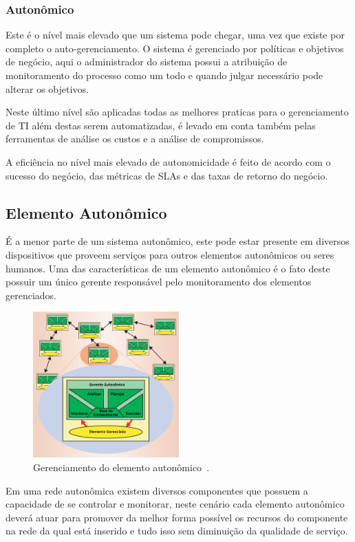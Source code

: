 \documentclass[11pt,twoside]{article}
\begin{document}
\subsubsection{Autonômico}
Este é o nível mais elevado que um sistema pode chegar, uma vez que existe por completo o auto-gerenciamento. O sistema é gerenciado por políticas e objetivos de negócio, aqui o administrador do sistema possui a atribuição de monitoramento do processo como um todo e quando julgar necessário pode alterar os objetivos. 

Neste último nível são aplicadas todas as melhores praticas para o gerenciamento de TI além destas serem automatizadas, é levado em conta também pelas ferramentas de análise os custos e a análise de compromissos.

A eficiência no nível mais elevado de autonomicidade é feito de acordo com o sucesso do negócio, das métricas de SLAs e das taxas de retorno do negócio.

\subsection{Elemento Autonômico}
É a menor parte de um sistema autonômico, este pode estar presente em diversos dispositivos que proveem serviços para outros elementos autonômicos ou seres humanos. Uma das características de um elemento autonômico é o fato deste possuir um único gerente responsável pelo monitoramento dos elementos gerenciados. 

\begin{figure}
    \centering
    \includegraphics[width=0.5\textwidth]{Picture3.png}
    \caption{Gerenciamento do elemento autonômico~\cite{KEPHART}.}
    \label{Sec:Intro:Fig3}
\end{figure}

Em uma rede autonômica existem diversos componentes que possuem a capacidade de se controlar e monitorar, neste cenário cada elemento autonômico deverá atuar para promover da melhor forma possível os recursos do componente na rede da qual está inserido e tudo isso sem diminuição da qualidade de serviço.
\end{document}
